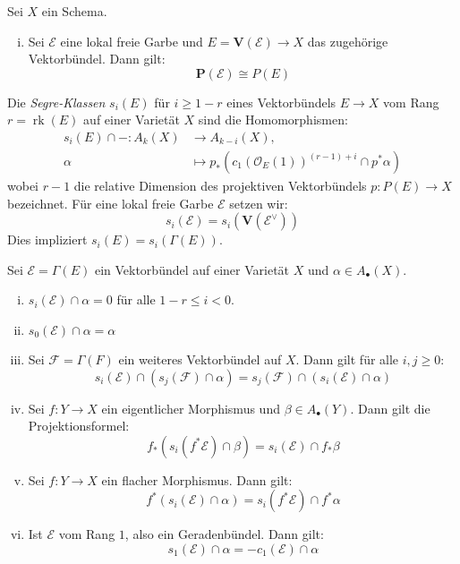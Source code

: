 \documentclass[10pt,a4paper]{article}
\begin{document}
\begin{proposition}
Sei $X$ ein Schema.
\begin{enumerate}[(i)]
\item Sei $\mathcal{E}$ eine lokal freie Garbe und $E=\mathbf{V}(\mathcal{E})\to X$ das zugehörige Vektorbündel. Dann gilt:
\[ \mathbf{P}(\mathcal{E})\cong P(E) \]
\end{enumerate}
\end{proposition}

\begin{definition}
Die \textit{Segre-Klassen} $s_i(E)$ für $i\geq 1-r$ eines Vektorbündels $E\to X$ vom Rang $r = \operatorname{rk}(E)$ auf einer Varietät $X$ sind die Homomorphismen:
\begin{align*}
s_i(E)\cap -: A_k(X)&\to A_{k-i}(X),\\ 
\alpha&\mapsto p_\ast(c_1(\mathcal{O}_E(1))^{(r-1)+i} \cap p^\ast\alpha)
\end{align*}
wobei $r-1$ die relative Dimension des projektiven Vektorbündels $p: P(E)\to X$ bezeichnet. Für eine lokal freie Garbe $\mathcal{E}$ setzen wir:
\[ s_i(\mathcal{E})= s_i(\mathbf{V}(\mathcal{E}^\vee)) \]
Dies impliziert $s_i(E) = s_i(\Gamma(E))$.
\end{definition}

\begin{proposition}
Sei $\mathcal{E} = \Gamma(E)$ ein Vektorbündel auf einer Varietät $X$ und $\alpha\in A_\bullet(X)$.
\begin{enumerate}[(i)]
\item $s_i(\mathcal{E})\cap\alpha = 0$ für alle $1-r\leq i <0$.
\item $s_0(\mathcal{E})\cap\alpha = \alpha$
\item Sei $\mathcal{F} = \Gamma(F)$ ein weiteres Vektorbündel auf $X$. Dann gilt für alle $i,j\geq 0$:
\[ s_i(\mathcal{E})\cap (s_j(\mathcal{F}) \cap \alpha) = s_j(\mathcal{F}) \cap (s_i(\mathcal{E})\cap \alpha) \]
\item Sei $f:Y\to X$ ein eigentlicher Morphismus und $\beta\in A_\bullet(Y)$. Dann gilt die Projektionsformel:
\[ f_\ast(s_i(f^\ast\mathcal{E})\cap\beta) = s_i(\mathcal{E})\cap f_\ast\beta \]
\item Sei $f:Y\to X$ ein flacher Morphismus. Dann gilt:
\[ f^\ast(s_i(\mathcal{E})\cap \alpha) = s_i(f^\ast\mathcal{E})\cap f^\ast\alpha \]
\item Ist $\mathcal{E}$ vom Rang $1$, also ein Geradenbündel. Dann gilt:
\[ s_1(\mathcal{E}) \cap\alpha = -c_1(\mathcal{E})\cap \alpha \]
\end{enumerate}
\end{proposition}
\end{document}
